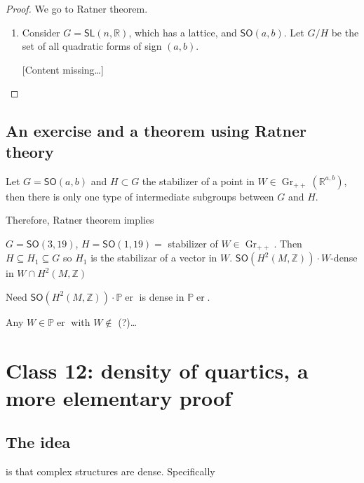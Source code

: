 \begin{proof}\leavevmode
	We go to Ratner theorem.

	\begin{enumerate}[label=\textbf{Step \arabic*}]
		\item Consider $G=\mathsf{SL}(n,\mathbb{R})$, which has a lattice, and $\mathsf{SO}(a,b)$. Let $G/H$ be the set of all quadratic forms of sign $(a,b)$.

			[Content missing…]
	\end{enumerate}
\end{proof}

\subsection{An exercise and a theorem using Ratner theory}

\begin{exercise}\leavevmode
	Let $G=\mathsf{SO}(a,b)$ and $H\subset G$ the stabilizer of a point in $W\in\operatorname{Gr}_{++}(\mathbb{R}^{a,b})$, then there is only one type of intermediate subgroups between $G$ and $H$.
\end{exercise}

Therefore, Ratner theorem implies

\begin{prop}\leavevmode
	$G=\mathsf{SO}(3,19)$, $H=\mathsf{SO}(1,19)=$ stabilizer of $W\in\operatorname{Gr}_{++}$. Then $H\subseteq H_1\subseteq G$ so $H_1$ is the stabilizar of a vector in $W$. $\mathsf{SO}(H^{2}(M,\mathbb{Z})) \cdot W$-dense in $W\cap H^{2}(M,\mathbb{Z})$ 

	\begin{thing4}{Need}\leavevmode
		$\mathsf{SO}(H^{2}(M,\mathbb{Z})) \cdot \mathbb{P}\operatorname{er}$ is dense in $\mathbb{P}\operatorname{er}$.
	\end{thing4}
	Any $W\in\mathbb{P}\operatorname{er}$ with $W \not\in$ (?)…
\end{prop}

\section{Class 12: density of quartics, a more elementary proof}

\subsection{The idea}
is that complex structures are dense. Specifically

